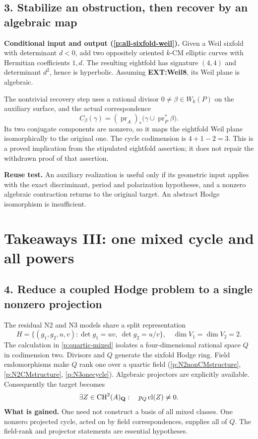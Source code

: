 \subsection*{3. Stabilize an obstruction, then recover by an algebraic map}
\textbf{Conditional input and output (\ref{p:all-sixfold-weil}).} Given a Weil sixfold with determinant $d<0$, add two oppositely oriented $k$-CM elliptic curves with Hermitian coefficients $1,d$. The resulting eightfold has signature $(4,4)$ and determinant $d^2$, hence is hyperbolic. Assuming \textbf{EXT:Weil8}, its Weil plane is algebraic.

The nontrivial recovery step uses a rational divisor $0\ne\beta\in W_k(P)$ on the auxiliary surface, and the actual correspondence
\[
 C_\beta(\gamma)=(\operatorname{pr}_A)_*
       \bigl(\gamma\cup\operatorname{pr}_P^*\beta\bigr).
\]
Its two conjugate components are nonzero, so it maps the eightfold Weil plane isomorphically to the original one. The cycle codimension is $4+1-2=3$. This is a proved implication from the stipulated eightfold assertion; it does not repair the withdrawn proof of that assertion.

\textbf{Reuse test.} An auxiliary realization is useful only if its geometric input applies with the exact discriminant, period and polarization hypotheses, and a nonzero algebraic contraction returns to the original target. An abstract Hodge isomorphism is insufficient.
\newpage
\section*{Takeaways III: one mixed cycle and all powers}
\subsection*{4. Reduce a coupled Hodge problem to a single nonzero projection}
The residual N2 and N3 models share a split representation
\[
 H=\{(g_1,g_2,u,v):\det g_1=uv,\ \det g_2=u/v\},
 \quad\dim V_1=\dim V_2=2.
\]
The calculation in \ref{p:quartic-mixed} isolates a four-dimensional rational space $Q$ in codimension two. Divisors and $Q$ generate the sixfold Hodge ring. Field endomorphisms make $Q$ rank one over a quartic field (\ref{p:N2nonCMstructure}, \ref{p:N2CMstructure}, \ref{p:N3onecycle}). Algebraic projectors are explicitly available. Consequently the target becomes
\[
 \exists Z\in\operatorname{CH}^2(A)_\mathbf Q:\quad p_Q\operatorname{cl}(Z)\ne0.
\]
\textbf{What is gained.} One need not construct a basis of all mixed classes. One nonzero projected cycle, acted on by field correspondences, supplies all of $Q$. The field-rank and projector statements are essential hypotheses.

